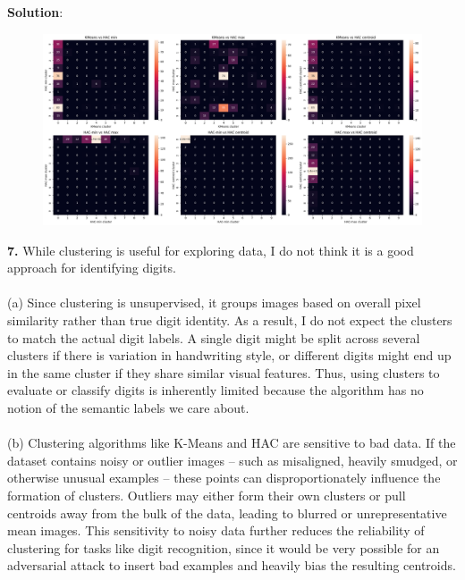 \documentclass[submit]{../harvardml}
\newenvironment{solution}{
    \vspace{2mm}
    \color{blue}\noindent\textbf{Solution}:
}{}
\begin{document}
\begin{solution}
    \begin{figure}[H]
        \centering
        \includegraphics[width=0.9\linewidth]{hw4/img_output/2.6.png}
    \end{figure}
    \textbf{7.} While clustering is useful for exploring data, I do not think it is a good approach for identifying digits. 
    \\
    \\
    (a) Since clustering is unsupervised, it groups images based on overall pixel similarity rather than true digit identity. As a result, I do not expect the clusters to match the actual digit labels. A single digit might be split across several clusters if there is variation in handwriting style, or different digits might end up in the same cluster if they share similar visual features. Thus, using clusters to evaluate or classify digits is inherently limited because the algorithm has no notion of the semantic labels we care about.
    \\
    \\
    (b) Clustering algorithms like K-Means and HAC are sensitive to bad data. If the dataset contains noisy or outlier images -- such as misaligned, heavily smudged, or otherwise unusual examples -- these points can disproportionately influence the formation of clusters. Outliers may either form their own clusters or pull centroids away from the bulk of the data, leading to blurred or unrepresentative mean images. This sensitivity to noisy data further reduces the reliability of clustering for tasks like digit recognition, since it would be very possible for an adversarial attack to insert bad examples and heavily bias the resulting centroids.
\end{solution}


\newpage
\end{document}
